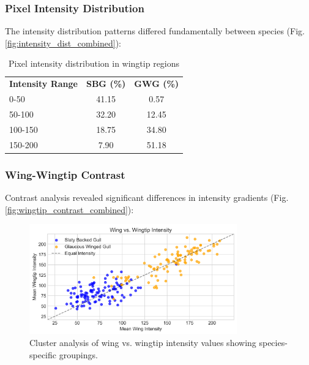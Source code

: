 \documentclass[a4paper,12pt]{report}
\begin{document}
\subsubsection{Pixel Intensity Distribution}
The intensity distribution patterns differed fundamentally between species (Fig. \ref{fig:intensity_dist_combined}):

\begin{table}[H]
\centering
\caption{Pixel intensity distribution in wingtip regions}
\label{tab:intensity_distribution}
\begin{tabular}{lcc}
\hline
\textbf{Intensity Range} & \textbf{SBG (\%)} & \textbf{GWG (\%)} \\
0-50 & 41.15 & 0.57 \\
50-100 & 32.20 & 12.45 \\
100-150 & 18.75 & 34.80 \\
150-200 & 7.90 & 51.18 \\ 
\end{tabular}
\end{table}

\subsubsection{Wing-Wingtip Contrast}
Contrast analysis revealed significant differences in intensity gradients (Fig. \ref{fig:wingtip_contrast_combined}):


\begin{figure}[H]
\centering
\includegraphics[width=0.8\textwidth]{images/REPORT_IMAGES_INTENSITY/I2/clusterwingwingtip.png}
\caption{Cluster analysis of wing vs. wingtip intensity values showing species-specific groupings.}
\label{fig:cluster_wingtip}
\end{figure}
\end{document}
